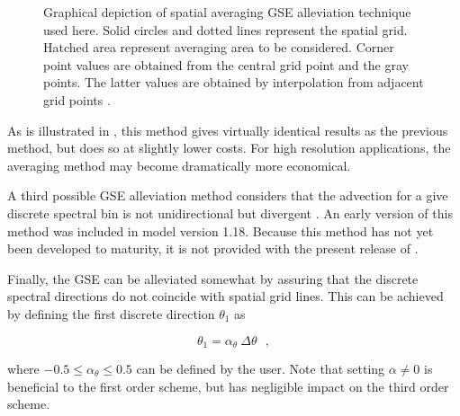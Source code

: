 \begin{figure} \begin{center}
\caption{Graphical depiction of spatial averaging GSE alleviation technique
used here. Solid circles and dotted lines represent the spatial grid. Hatched
area represent averaging area to be considered. Corner point values are
obtained from the central grid point and the gray points. The latter values
are obtained by interpolation from adjacent grid points
\citep[from][]{tol:OMOD02b}.}
\label{fig:GSE_1} \botline
\end{center}
\end{figure}

As is illustrated in \cite{tol:OMOD02b,tol:OMB02b}, this method gives
virtually identical results as the previous method, but does so at slightly
lower costs. For high resolution applications, the averaging method may become
dramatically more economical.

A third possible GSE alleviation method considers that the advection for a
give discrete spectral bin is not unidirectional but divergent
\citep[see][]{tol:OMOD02b}.  An early version of this method was included in
model version 1.18. Because this method has not yet been developed to
maturity, it is not provided with the present release of \ws.

Finally, the GSE can be alleviated somewhat by assuring that the discrete
spectral directions do not coincide with spatial grid lines. This can be
achieved by defining the first discrete direction $\theta_1$ as


\begin{equation}
\theta_1 = \alpha_\theta \: \Delta \theta \:\:\: , \label{eq:theta1}
\end{equation}

\noindent
where $-0.5 \leq \alpha_\theta \leq 0.5$ can be defined by the user. Note that
setting $\alpha \neq 0$ is beneficial to the first order scheme, but has
negligible impact on the third order scheme.
 
